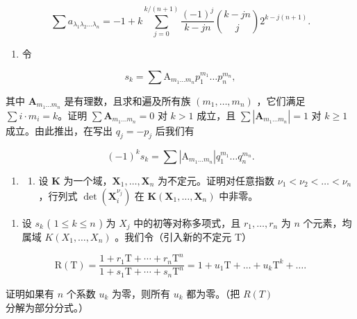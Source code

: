 \[
\sum a _ {\lambda_ {1} \lambda_ {2} \dots \lambda_ {n}} = - 1 + k \sum_ {j = 0} ^ {k / (n + 1)} \frac {(- 1) ^ {j}}{k - j n} \binom {k - j n} {j} 2 ^ {k - j (n + 1)}.
\]

\begin{enumerate}
\def\labelenumi{\arabic{enumi})}
\setcounter{enumi}{7}
\tightlist
\item
  令
\end{enumerate}

\[
s _ {k} = \sum \mathrm{A} _ {m _ {1} \dots m _ {n}} p _ {1} ^ {m _ {1}} \dots p _ {n} ^ {m _ {n}},
\]

其中 \(\mathbf{A}_{m_1\dots m_n}\) 是有理数，且求和遍及所有族 \((m_1,\dots,m_n)\) ，它们满足 \(\sum i\cdot m_i = k\)。证明 \(\sum \mathbf{A}_{m_1\dots m_n} = 0\) 对 \(k > 1\) 成立，且 \(\sum |\mathbf{A}_{m_1\dots m_n}| = 1\) 对 \(k\geqslant 1\) 成立。由此推出，在写出 \(q_{j} = -p_{j}\) 后我们有

\[
(- 1) ^ {k} s _ {k} = \sum \left| \mathrm{A} _ {m _ {1} \dots m _ {n}} \right| q _ {1} ^ {m _ {1}} \dots q _ {n} ^ {m _ {n}}.
\]

\begin{enumerate}
\def\labelenumi{\arabic{enumi})}
\setcounter{enumi}{8}
\tightlist
\item
  \begin{enumerate}
  \def\labelenumii{\alph{enumii})}
  \tightlist
  \item
    设 \(\mathbf{K}\) 为一个域，\(\mathbf{X}_1, \ldots, \mathbf{X}_n\) 为不定元。证明对任意指数 \(\nu_1 < \nu_2 < \ldots < \nu_n\)，行列式 \(\det(\mathbf{X}_i^{\nu_j})\) 在 \(\mathbf{K}(\mathbf{X}_1, \ldots, \mathbf{X}_n)\) 中非零。
  \end{enumerate}
\end{enumerate}

\begin{enumerate}
\def\labelenumi{\alph{enumi})}
\setcounter{enumi}{1}
\tightlist
\item
  设 \(s_k\) ( \(1 \leqslant k \leqslant n\) ) 为 \(X_j\) 中的初等对称多项式，且 \(r_1, \ldots, r_n\) 为 \(n\) 个元素，均属域 \(K(X_1, \ldots, X_n)\) 。我们令（引入新的不定元 T）
\end{enumerate}

\[
\mathrm{R} (\mathrm{T}) = \frac {1 + r _ {1} \mathrm{T} + \cdots + r _ {n} \mathrm{T} ^ {n}}{1 + s _ {1} \mathrm{T} + \cdots + s _ {n} \mathrm{T} ^ {n}} = 1 + u _ {1} \mathrm{T} + \dots + u _ {k} \mathrm{T} ^ {k} + \dots .
\]

证明如果有 \(n\) 个系数 \(u_{k}\) 为零，则所有 \(u_{k}\) 都为零。（把 \(R(T)\) 分解为部分分式。）

